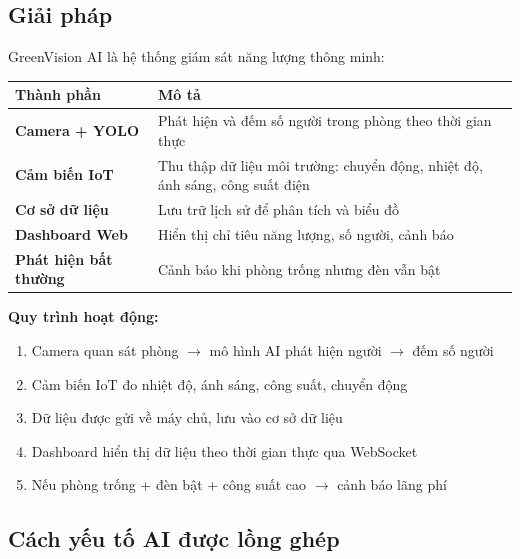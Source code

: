 \documentclass[12pt,a4paper]{article}
\begin{document}
\subsection{Giải pháp}

GreenVision AI là hệ thống giám sát năng lượng thông minh:

\vspace{0.3cm}
\begin{center}
\begin{tabular}{>{\bfseries}p{4cm} p{10cm}}
    \toprule
    Thành phần & Mô tả \\
    \midrule
    Camera + YOLO & Phát hiện và đếm số người trong phòng theo thời gian thực \\
    Cảm biến IoT & Thu thập dữ liệu môi trường: chuyển động, nhiệt độ, ánh sáng, công suất điện \\
    Cơ sở dữ liệu & Lưu trữ lịch sử để phân tích và biểu đồ \\
    Dashboard Web & Hiển thị chỉ tiêu năng lượng, số người, cảnh báo \\
    Phát hiện bất thường & Cảnh báo khi phòng trống nhưng đèn vẫn bật \\
    \bottomrule
\end{tabular}
\end{center}

\vspace{0.5cm}
\textbf{Quy trình hoạt động:}

\begin{enumerate}[leftmargin=1.5cm]
    \item Camera quan sát phòng $\rightarrow$ mô hình AI phát hiện người $\rightarrow$ đếm số người
    \item Cảm biến IoT đo nhiệt độ, ánh sáng, công suất, chuyển động
    \item Dữ liệu được gửi về máy chủ, lưu vào cơ sở dữ liệu
    \item Dashboard hiển thị dữ liệu theo thời gian thực qua WebSocket
    \item Nếu phòng trống + đèn bật + công suất cao $\rightarrow$ cảnh báo lãng phí
\end{enumerate}

\subsection{Cách yếu tố AI được lồng ghép}
\end{document}
